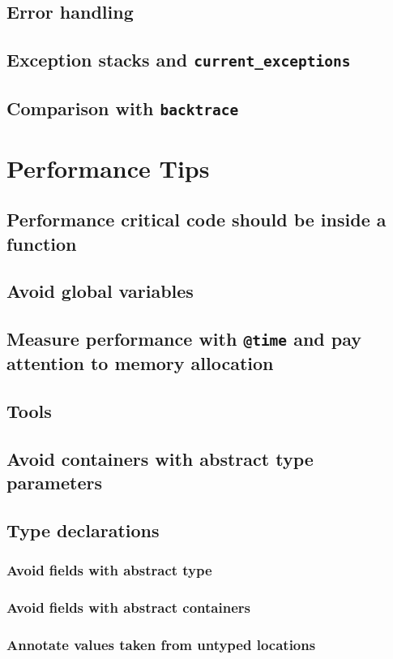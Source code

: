     \section{Error handling}
    \section{Exception stacks and \texttt{current\_exceptions}}
    \section{Comparison with \texttt{backtrace}}
  \chapter{Performance Tips}
    \section{Performance critical code should be inside a function}
    \section{Avoid global variables}
    \section{Measure performance with \texttt{@time} and pay attention to memory allocation}
    \section{Tools}
    \section{Avoid containers with abstract type parameters}
    \section{Type declarations}
    \subsection{Avoid fields with abstract type}
    \subsection{Avoid fields with abstract containers}
    \subsection{Annotate values taken from untyped locations}
